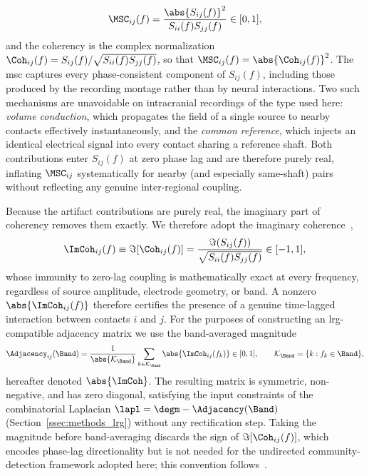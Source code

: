 \begin{equation}
    \MSC_{ij}(f) = \frac{\abs{S_{ij}(f)}^{2}}{S_{ii}(f) S_{jj}(f)} \in [0,1],
    \label{eq:methods_msc}
\end{equation}
and the coherency is the complex normalization \(\Coh_{ij}(f) = S_{ij}(f) / \sqrt{S_{ii}(f) S_{jj}(f)}\), so that \(\MSC_{ij}(f) = \abs{\Coh_{ij}(f)}^{2}\). The \gls{msc} captures every phase-consistent component of \(S_{ij}(f)\), including those produced by the recording montage rather than by neural interactions. Two such mechanisms are unavoidable on intracranial recordings of the type used here: \emph{volume conduction}, which propagates the field of a single source to nearby contacts effectively instantaneously, and the \emph{common reference}, which injects an identical electrical signal into every contact sharing a reference shaft. Both contributions enter \(S_{ij}(f)\) at zero phase lag and are therefore purely real, inflating \(\MSC_{ij}\) systematically for nearby (and especially same-shaft) pairs without reflecting any genuine inter-regional coupling.

Because the artifact contributions are purely real, the imaginary part of coherency removes them exactly. We therefore adopt the imaginary coherence~\cite{nolte2004identifying},
\begin{equation}
    \ImCoh_{ij}(f) \equiv \Im[\Coh_{ij}(f)] = \frac{\Im(S_{ij}(f))}{\sqrt{S_{ii}(f) S_{jj}(f)}} \in [-1,1],
    \label{eq:methods_imcoh_signed}
\end{equation}
whose immunity to zero-lag coupling is mathematically exact at every frequency, regardless of source amplitude, electrode geometry, or band. A nonzero \(\abs{\ImCoh_{ij}(f)}\) therefore certifies the presence of a genuine time-lagged interaction between contacts \(i\) and \(j\). For the purposes of constructing an \gls{lrg}-compatible adjacency matrix we use the band-averaged magnitude
\begin{equation}
    \Adjacency_{ij}(\Band) = \frac{1}{\abs{\mathcal{K}_{\Band}}} \sum_{k \in \mathcal{K}_{\Band}} \abs{\ImCoh_{ij}(f_{k})} \in [0,1], \qquad \mathcal{K}_{\Band} = \{k : f_{k} \in \Band\},
    \label{eq:methods_imcoh_bandavg}
\end{equation}
hereafter denoted \(\abs{\ImCoh}\). The resulting matrix is symmetric, non-negative, and has zero diagonal, satisfying the input constraints of the combinatorial Laplacian \(\lapl = \degm - \Adjacency(\Band)\) (Section~\ref{ssec:methods_lrg}) without any rectification step. Taking the magnitude before band-averaging discards the sign of \(\Im[\Coh_{ij}(f)]\), which encodes phase-lag directionality but is not needed for the undirected community-detection framework adopted here; this convention follows~\citet{ewald2012estimating,bastos2015functional}.
%
